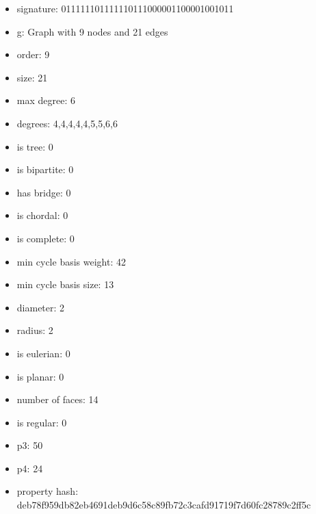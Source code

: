 \newpage
\begin{figure}
\end{figure}
\begin{itemize}
\item signature: 011111101111110111000001100001001011
\item g: Graph with 9 nodes and 21 edges
\item order: 9
\item size: 21
\item max degree: 6
\item degrees: 4,4,4,4,4,5,5,6,6
\item is tree: 0
\item is bipartite: 0
\item has bridge: 0
\item is chordal: 0
\item is complete: 0
\item min cycle basis weight: 42
\item min cycle basis size: 13
\item diameter: 2
\item radius: 2
\item is eulerian: 0
\item is planar: 0
\item number of faces: 14
\item is regular: 0
\item p3: 50
\item p4: 24
\item property hash: deb78f959db82eb4691deb9d6c58c89fb72c3cafd91719f7d60fc28789c2ff5c
\end{itemize}
